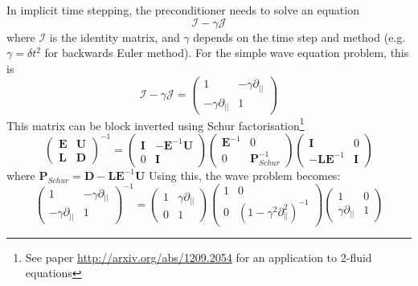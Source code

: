 \documentclass[12pt]{article}
\newcommand{\bb}[1]{\mathbf{#1}}
\begin{document}
In implicit time stepping, the preconditioner needs to solve an equation
\[
\mathcal{I} - \gamma \mathcal{J}
\]
where $\mathcal{I}$ is the identity matrix, and $\gamma$ depends on the time
step and method (e.g. $\gamma = \delta t^2$ for backwards Euler method). For the
simple wave equation problem, this is
\[
\mathcal{I} - \gamma \mathcal{J} = \left(\begin{array}{cc}
1 & -\gamma\partial_{||} \\
-\gamma\partial_{||} & 1
\end{array}\right)
\]
This matrix can be block inverted using Schur factorisation\footnote{See paper \url{http://arxiv.org/abs/1209.2054} for an application to 2-fluid equations}
\[
\left(\begin{array}{cc}
  \bb{E} & \bb{U} \\
  \bb{L} & \bb{D}
\end{array}\right)^{-1} =
\left(\begin{array}{cc}
  \bb{I} & -\bb{E}^{-1}\bb{U} \\
  0 & \bb{I}
\end{array}\right)\left(\begin{array}{cc}
  \bb{E}^{-1} & 0 \\
  0 & \bb{P}_{Schur}^{-1}
\end{array}\right)\left(\begin{array}{cc}
  \bb{I} & 0 \\
  -\bb{L}\bb{E}^{-1} & \bb{I}
\end{array}\right)
\]
where $\bb{P}_{Schur} = \bb{D} - \bb{L}\bb{E}^{-1}\bb{U}$
Using this, the wave problem becomes:
\begin{equation}
\left(\begin{array}{cc}
1 & -\gamma\partial_{||} \\
-\gamma\partial_{||} & 1
\end{array}\right)^{-1} = \left(\begin{array}{cc}
1 & \gamma\partial_{||} \\
0 & 1
\end{array}\right)\left(\begin{array}{cc}
1 & 0 \\
0 & \left(1 - \gamma^2\partial^2_{||}\right)^{-1}
\end{array}\right)\left(\begin{array}{cc}
1 & 0 \\
\gamma\partial_{||} & 1
\end{array}\right)
\label{eq:precon}
\end{equation}
\end{document}
